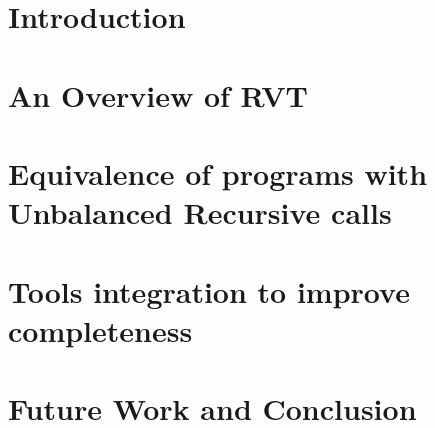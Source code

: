 \documentclass[12pt]{report}
\begin{document}
\chapter{Introduction}


\chapter{An Overview of RVT}


\chapter{Equivalence of programs with Unbalanced Recursive calls}
\label{chptr:rec}


\chapter{Tools integration to improve completeness}
\label{chptr:integ}



\chapter{Future Work and Conclusion}






  

\end{document}
